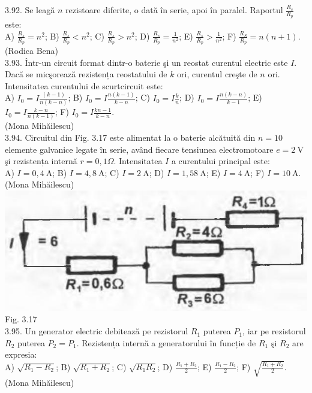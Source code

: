 3.92. Se leagă $n$ rezistoare diferite, o dată în serie, apoi în paralel. Raportul $\frac{R_{s}}{R_{p}}$ este:\\ A) $\frac{R_{s}}{R_{p}}=n^{2}$; B) $\frac{R_{s}}{R_{p}}<n^{2}$; C) $\frac{R_{s}}{R_{p}}>n^{2}$; D) $\frac{R_{s}}{R_{p}}=\frac{1}{n^{2}}$; E) $\frac{R_{s}}{R_{p}}>\frac{1}{n^{2}}$; F) $\frac{R_{S}}{R_{p}}=n(n+1)$.\\ (Rodica Bena)\\

3.93. Într-un circuit format dintr-o baterie şi un reostat curentul electric este $I$. Dacă se micşorează rezistența reostatului de $k$ ori, curentul creşte de $n$ ori. Intensitatea curentului de scurtcircuit este:\\ A) $I_{0}=I \frac{(k-1)}{n(k-n)}$; B) $I_{0}=I \frac{n(k-1)}{k-n}$; C) $I_{0}=I \frac{k}{n}$; D) $I_{0}=I \frac{n(k-n)}{k-1}$; E) $I_{0}=I \frac{k-n}{n(k-1)}$; F) $I_{0}=I \frac{k n-1}{k-n}$.\\ (Mona Mihăilescu)\\

3.94. Circuitul din Fig. 3.17 este alimentat la o baterie alcătuită din $n=10$ elemente galvanice legate în serie, având fiecare tensiunea electromotoare $e=2 \mathrm{~V}$ şi rezistența internă $r=0,1 \Omega$. Intensitatea $I$ a curentului principal este:\\ A) $I=0,4 \mathrm{~A}$; B) $I=4,8 \mathrm{~A}$; C) $I=2 \mathrm{~A}$; D) $I=1,58 \mathrm{~A}$; E) $I=4 \mathrm{~A}$; F) $I=10 \mathrm{~A}$.\\ (Mona Mihăilescu)\\ \includegraphics[width=0.4\linewidth]{images/2025_07_01_5b3ff9fa0d508c8e9f17g-164} Fig. 3.17\\

3.95. Un generator electric debitează pe rezistorul $R_{1}$ puterea $P_{1}$, iar pe rezistorul $R_{2}$ puterea $P_{2}=P_{1}$. Rezistența internă a generatorului în funcție de $R_{1}$ şi $R_{2}$ are expresia:\\ A) $\sqrt{R_{1}-R_{2}}$; B) $\sqrt{R_{1}+R_{2}}$; C) $\sqrt{R_{1} R_{2}}$; D) $\frac{R_{1}+R_{2}}{2}$; E) $\frac{R_{1}-R_{2}}{2}$; F) $\sqrt{\frac{R_{1}+R_{2}}{2}}$.\\ (Mona Mihăilescu)\\

